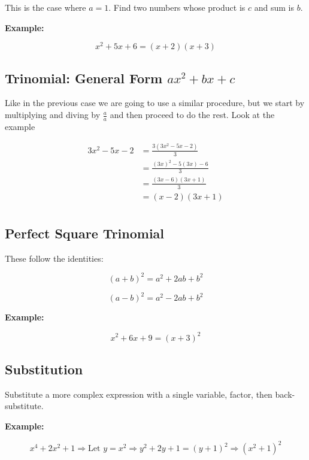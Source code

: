 This is the case where \(a = 1\). Find two numbers whose product is \(c\) and sum is \(b\).
\vspace{\baselineskip}

\textbf{Example:}

\[
  x^2 + 5x + 6 = (x + 2)(x + 3)
\]

\subsection{Trinomial: General Form \texorpdfstring{\(ax^2 + bx + c\)}{ax² + bx + c}}

Like in the previous case we are going to use a similar procedure, but we start by
multiplying and diving by \(\frac{a}{a}\) and then proceed to do the rest. Look at the example

\begin{align*}
3x^2 -5x - 2 &= \frac{3(3x^2 -5x - 2)}{3} \\
             &= \frac{{(3x)}^2 -5(3x) - 6}{3}\\ 
             &= \frac{(3x- 6)(3x+1)}{3} \\
             &= (x- 2)(3x +1) \\
\end{align*}


\subsection{Perfect Square Trinomial}

These follow the identities:

\[
  {(a + b)}^2 = a^2 + 2ab + b^2
\]

\[
  {(a - b)}^2 = a^2 - 2ab + b^2
\]

\textbf{Example:}
\vspace{\baselineskip}

\[
  x^2 + 6x + 9 = {(x + 3)}^2
\]

\subsection{Substitution}

Substitute a more complex expression with a single variable, factor, then back-substitute.
\vspace{\baselineskip}

\textbf{Example:}

\[
  x^4 + 2x^2 + 1 \Rightarrow \text{Let } y = x^2 \Rightarrow y^2 + 2y + 1 = {(y + 1)}^2 \Rightarrow {(x^2 + 1)}^2
\]

